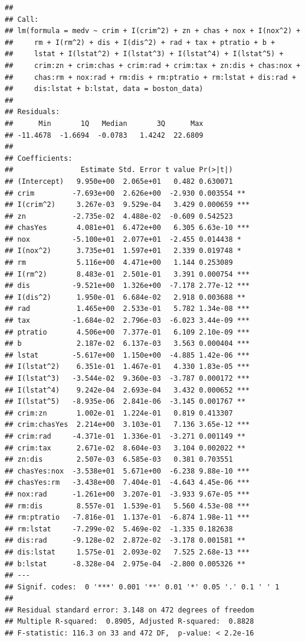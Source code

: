 \documentclass[
]{article}
\begin{document}
\begin{verbatim}
## 
## Call:
## lm(formula = medv ~ crim + I(crim^2) + zn + chas + nox + I(nox^2) + 
##     rm + I(rm^2) + dis + I(dis^2) + rad + tax + ptratio + b + 
##     lstat + I(lstat^2) + I(lstat^3) + I(lstat^4) + I(lstat^5) + 
##     crim:zn + crim:chas + crim:rad + crim:tax + zn:dis + chas:nox + 
##     chas:rm + nox:rad + rm:dis + rm:ptratio + rm:lstat + dis:rad + 
##     dis:lstat + b:lstat, data = boston_data)
## 
## Residuals:
##      Min       1Q   Median       3Q      Max 
## -11.4678  -1.6694  -0.0783   1.4242  22.6809 
## 
## Coefficients:
##                Estimate Std. Error t value Pr(>|t|)    
## (Intercept)   9.950e+00  2.065e+01   0.482 0.630071    
## crim         -7.693e+00  2.626e+00  -2.930 0.003554 ** 
## I(crim^2)     3.267e-03  9.529e-04   3.429 0.000659 ***
## zn           -2.735e-02  4.488e-02  -0.609 0.542523    
## chasYes       4.081e+01  6.472e+00   6.305 6.63e-10 ***
## nox          -5.100e+01  2.077e+01  -2.455 0.014438 *  
## I(nox^2)      3.735e+01  1.597e+01   2.339 0.019748 *  
## rm            5.116e+00  4.471e+00   1.144 0.253089    
## I(rm^2)       8.483e-01  2.501e-01   3.391 0.000754 ***
## dis          -9.521e+00  1.326e+00  -7.178 2.77e-12 ***
## I(dis^2)      1.950e-01  6.684e-02   2.918 0.003688 ** 
## rad           1.465e+00  2.533e-01   5.782 1.34e-08 ***
## tax          -1.684e-02  2.796e-03  -6.023 3.44e-09 ***
## ptratio       4.506e+00  7.377e-01   6.109 2.10e-09 ***
## b             2.187e-02  6.137e-03   3.563 0.000404 ***
## lstat        -5.617e+00  1.150e+00  -4.885 1.42e-06 ***
## I(lstat^2)    6.351e-01  1.467e-01   4.330 1.83e-05 ***
## I(lstat^3)   -3.544e-02  9.360e-03  -3.787 0.000172 ***
## I(lstat^4)    9.242e-04  2.693e-04   3.432 0.000652 ***
## I(lstat^5)   -8.935e-06  2.841e-06  -3.145 0.001767 ** 
## crim:zn       1.002e-01  1.224e-01   0.819 0.413307    
## crim:chasYes  2.214e+00  3.103e-01   7.136 3.65e-12 ***
## crim:rad     -4.371e-01  1.336e-01  -3.271 0.001149 ** 
## crim:tax      2.671e-02  8.604e-03   3.104 0.002022 ** 
## zn:dis        2.507e-03  6.585e-03   0.381 0.703551    
## chasYes:nox  -3.538e+01  5.671e+00  -6.238 9.88e-10 ***
## chasYes:rm   -3.438e+00  7.404e-01  -4.643 4.45e-06 ***
## nox:rad      -1.261e+00  3.207e-01  -3.933 9.67e-05 ***
## rm:dis        8.557e-01  1.539e-01   5.560 4.53e-08 ***
## rm:ptratio   -7.816e-01  1.137e-01  -6.874 1.98e-11 ***
## rm:lstat     -7.299e-02  5.469e-02  -1.335 0.182638    
## dis:rad      -9.128e-02  2.872e-02  -3.178 0.001581 ** 
## dis:lstat     1.575e-01  2.093e-02   7.525 2.68e-13 ***
## b:lstat      -8.328e-04  2.975e-04  -2.800 0.005326 ** 
## ---
## Signif. codes:  0 '***' 0.001 '**' 0.01 '*' 0.05 '.' 0.1 ' ' 1
## 
## Residual standard error: 3.148 on 472 degrees of freedom
## Multiple R-squared:  0.8905, Adjusted R-squared:  0.8828 
## F-statistic: 116.3 on 33 and 472 DF,  p-value: < 2.2e-16
\end{verbatim}
\end{document}

